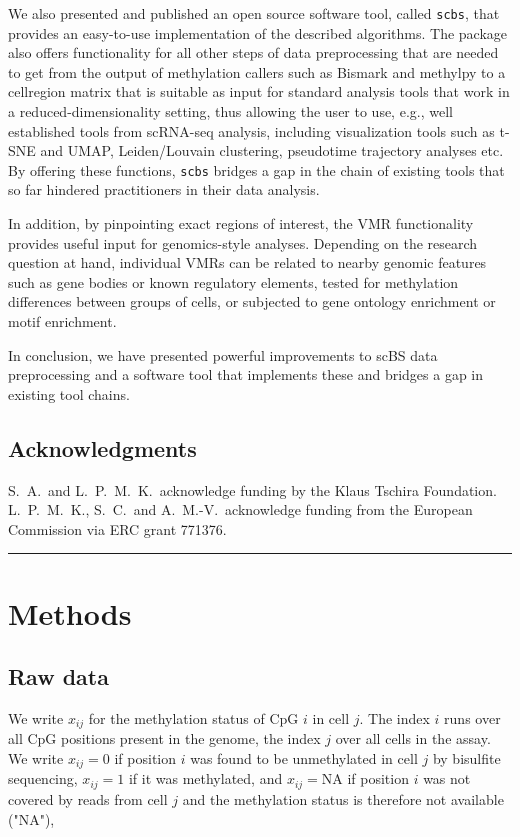 \documentclass[twocolumn,10pt]{article}
\begin{document}
We also presented and published an open source software tool, called \texttt{scbs}, that provides an easy-to-use implementation of the described algorithms. The package also offers functionality for all other steps of data preprocessing that are needed to get from the output of methylation callers such as Bismark and methylpy to a cell\texttimes region matrix that is suitable as input for standard analysis tools that work in a reduced-dimensionality setting, thus allowing the user to use, e.g., well established tools from scRNA-seq analysis, including visualization tools such as t-SNE and UMAP, Leiden/Louvain clustering, pseudotime trajectory analyses etc. By offering these functions, \texttt{scbs} bridges a gap in the chain of existing tools that so far hindered practitioners in their data analysis.

In addition, by pinpointing exact regions of interest, the VMR functionality provides useful input for genomics-style analyses.
Depending on the research question at hand, individual VMRs can be related to nearby genomic features such as gene bodies or known regulatory elements, tested for methylation differences between groups of cells, or subjected to gene ontology enrichment or motif enrichment.

In conclusion, we have presented powerful improvements to scBS data preprocessing and a software tool that implements these and bridges a gap in existing tool chains.

\subsection{Acknowledgments}

S.\ A.\ and L.\ P.\ M.\ K.\ acknowledge funding by the Klaus Tschira Foundation.
L.\ P.\ M.\ K., S.\ C.\ and A.\ M.-V.\ acknowledge funding from the European Commission via ERC grant 771376.

\vspace{1.4ex}
\noindent\hfil\rule{.6\columnwidth}{.2pt}\hfil

\section{Methods}

\subsection{Raw data}

We write $x_{ij}$ for the methylation status of CpG $i$ in cell $j$. The index $i$ runs over all CpG positions present in the genome, the index $j$ over all cells in the assay. We write $x_{ij}=0$ if position $i$ was found to be unmethylated in cell $j$ by bisulfite sequencing, $x_{ij}=1$ if it was methylated, and $x_{ij}=\text{NA}$ if position $i$ was not covered by reads from cell $j$ and the methylation status is therefore not available ("NA"),
\end{document}
